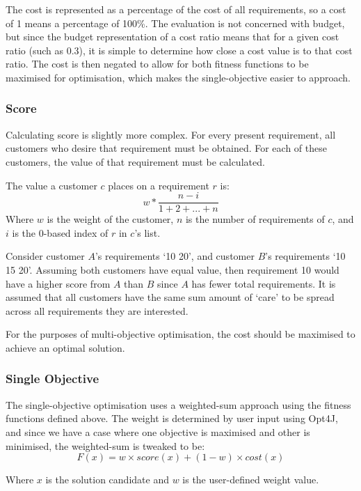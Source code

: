 \documentclass[11pt, a4paper]{article}
\begin{document}
The cost is represented as a percentage of the cost of all requirements, so a
cost of 1 means a percentage of 100\%. The evaluation is not concerned with
budget, but since the budget representation of a cost ratio means that for a
given cost ratio (such as 0.3), it is simple to determine how close a cost value
is to that cost ratio. The cost is then negated to allow for both fitness
functions to be maximised for optimisation, which makes the single-objective
easier to approach.

\subsubsection{Score} %
\label{ssub:score}
Calculating score is slightly more complex. For every present requirement, all
customers who desire that requirement must be obtained. For each of these
customers, the value of that requirement must be calculated.

The value a customer \(c\) places on a requirement \(r\) is:
\[w * \frac{n - i}{1 + 2 + ... + n}\]
Where \(w\) is the weight of the customer, \(n\) is the number of requirements
of \(c\), and \(i\) is the 0-based index of \(r\) in \(c\)'s list.

Consider customer \(A\)'s requirements `10 20', and customer \(B\)'s
requirements `10 15 20'. Assuming both customers have equal value, then
requirement 10 would have a higher score from \(A\) than \(B\) since \(A\) has
fewer total requirements. It is assumed that all customers have the same sum
amount of `care' to be spread across all requirements they are interested.

For the purposes of multi-objective optimisation, the cost should be maximised
to achieve an optimal solution.

\subsubsection{Single Objective} %
\label{ssub:single_objective}
The single-objective optimisation uses a weighted-sum approach using the fitness
functions defined above. The weight is determined by user input using Opt4J, and
since we have a case where one objective is maximised and other is minimised,
the weighted-sum is tweaked to be:
\[F(x) = w \times score(x) + (1 - w) \times cost(x)\]

Where \(x\) is the solution candidate and \(w\) is the user-defined weight
value.
\end{document}
